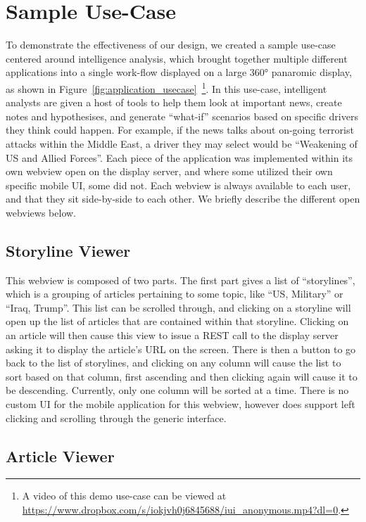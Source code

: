 \section{Sample Use-Case}

To demonstrate the effectiveness of our design, we created a sample
use-case centered around intelligence analysis, which brought together
multiple different applications into a single work-flow displayed
on a large 360° panaromic display, as shown in Figure~\ref{fig:application_usecase}~\footnote{A video of this demo 
use-case can be viewed at \url{https://www.dropbox.com/s/iokjvh0j6845688/iui_anonymous.mp4?dl=0}.}.
In this use-case, intelligent analysts are given a host of tools
to help them look at important news, create notes and hypothesises,
and generate ``what-if'' scenarios based on specific drivers they 
think could happen. For example, if the news talks about on-going
terrorist attacks within the Middle East, a driver they may select
would be ``Weakening of US and Allied Forces''.
Each piece of the application was implemented within its own webview 
open on the display server, and
where some utilized their own specific mobile UI, some did not. Each webview is always available to each user, and that they sit side-by-side to each other. We
briefly describe the different open webviews below. 

\subsection{Storyline Viewer}

This webview is composed of two parts. The first part gives a list
of ``storylines'', which is a grouping of articles pertaining to some
topic, like ``US, Military'' or ``Iraq, Trump''. This list can be
scrolled through, and clicking on a storyline will open up the list
of articles that are contained within that storyline. Clicking on an
article will then cause this view to issue a REST call to the display
server asking it to display the article's URL on the screen. There is
then a button to go back to the list of storylines, and clicking on
any column will cause the list to sort based on that column, first
ascending and then clicking again will cause it to be descending.
Currently, only one column will be sorted at a time. There is no
custom UI for the mobile application for this webview, however does
support left clicking and scrolling through the generic interface.

\subsection{Article Viewer}

